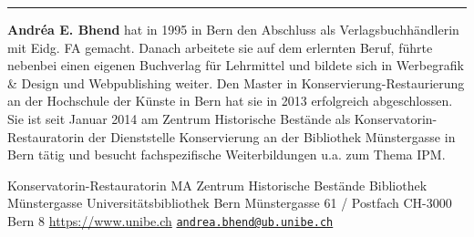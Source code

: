 \begin{center}\rule{0.5\linewidth}{0.5pt}\end{center}

\textbf{Andréa E. Bhend} hat in 1995 in Bern den Abschluss als
Verlagsbuchhändlerin mit Eidg. FA gemacht. Danach arbeitete sie auf dem
erlernten Beruf, führte nebenbei einen eigenen Buchverlag für Lehrmittel
und bildete sich in Werbegrafik \& Design und Webpublishing weiter. Den
Master in Konservierung-Restaurierung an der Hochschule der Künste in
Bern hat sie in 2013 erfolgreich abgeschlossen. Sie ist seit Januar 2014
am Zentrum Historische Bestände als Konservatorin-Restauratorin der
Dienststelle Konservierung an der Bibliothek Münstergasse in Bern tätig
und besucht fachspezifische Weiterbildungen u.a. zum Thema IPM.

Konservatorin-Restauratorin MA Zentrum Historische Bestände Bibliothek
Münstergasse Universitätsbibliothek Bern Münstergasse 61 / Postfach
CH-3000 Bern 8 \url{https://www.unibe.ch} \textbar{}
\href{mailto:andrea.bhend@ub.unibe.ch}{\nolinkurl{andrea.bhend@ub.unibe.ch}}
